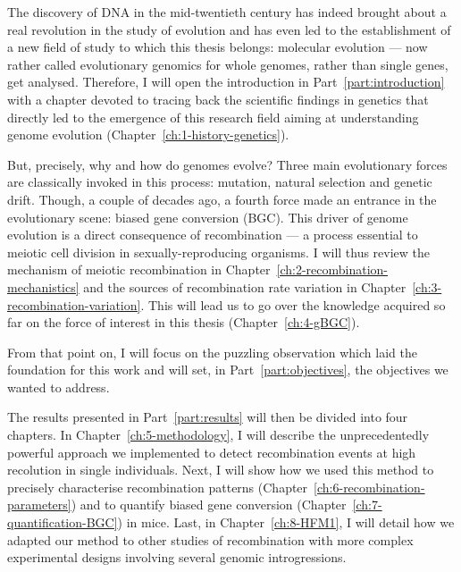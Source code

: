 The discovery of DNA in the mid-twentieth century \citep{franklin1953molecular,watson1953molecular,wilkins1953molecular} has indeed brought about a real revolution in the study of evolution and has even led to the establishment of a new field of study to which this thesis belongs: molecular evolution — now rather called evolutionary genomics for whole genomes, rather than single genes, get analysed.
Therefore, I will open the introduction in Part~\ref{part:introduction} with a chapter devoted to tracing back the scientific findings in genetics that directly led to the emergence of this research field aiming at understanding genome evolution (Chapter~\ref{ch:1-history-genetics}).

But, precisely, why and how do genomes evolve?
Three main evolutionary forces are classically invoked in this process: mutation, natural selection and genetic drift.
Though, a couple of decades ago, a fourth force made an entrance in the evolutionary scene: biased gene conversion (BGC).
This driver of genome evolution is a direct consequence of recombination — a process essential to meiotic cell division in sexually-reproducing organisms. 
I will thus review the mechanism of meiotic recombination in Chapter~\ref{ch:2-recombination-mechanistics} and the sources of recombination rate variation in Chapter~\ref{ch:3-recombination-variation}. 
This will lead us to go over the knowledge acquired so far on the force of interest in this thesis (Chapter~\ref{ch:4-gBGC}).

From that point on, I will focus on the puzzling observation which laid the foundation for this work and will set, in Part~\ref{part:objectives}, the objectives we wanted to address.

The results presented in Part~\ref{part:results} will then be divided into four chapters.
In Chapter~\ref{ch:5-methodology}, I will describe the unprecedentedly powerful approach we implemented to detect recombination events at high recolution in single individuals.
Next, I will show how we used this method to precisely characterise recombination patterns (Chapter~\ref{ch:6-recombination-parameters}) and to quantify biased gene conversion (Chapter~\ref{ch:7-quantification-BGC}) in mice.
Last, in Chapter~\ref{ch:8-HFM1}, I will detail how we adapted our method to other studies of recombination with more complex experimental designs involving several genomic introgressions.

